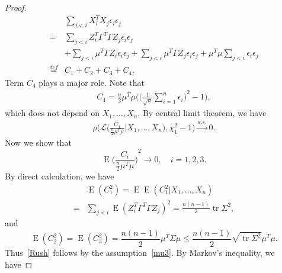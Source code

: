 \documentclass[smallcondensed,final,natbib]{svjour3}          %
\DeclareMathOperator{\mytr}{tr}
\DeclareMathOperator{\myE}{E}
\begin{document}
\begin{proof}
    \begin{equation*}
        \begin{aligned}
            &\sum_{j<i} X_i^T X_j \epsilon_i\epsilon_j\\
            =&
            \sum_{j<i} Z_i^T \Gamma^T \Gamma Z_j \epsilon_i\epsilon_j\\
            &+
            \sum_{j<i} \mu^T \Gamma Z_i \epsilon_i\epsilon_j
            +\sum_{j<i} \mu^T \Gamma Z_j \epsilon_i\epsilon_j+
            \mu^T \mu \sum_{j<i} \epsilon_i\epsilon_j\\
            \overset{def}{=}&C_1+C_2+C_3+C_4.
        \end{aligned}
    \end{equation*}
Term $C_4$ plays a major role. Note that
    \begin{equation*}
        \begin{aligned}
            C_4=\frac{n}{2}\mu^T \mu\Big({\Big(\frac{1}{\sqrt{n}}\sum_{i=1}^n \epsilon_i\Big)}^2-1\Big),
        \end{aligned}
    \end{equation*}
    which does not depend on $X_1,\ldots,X_n$.
By central limit theorem, we have
    \begin{equation}\label{Rush2}
        \begin{aligned}
            \rho\Big(\mathcal{L}\Big(\frac{C_4}{\frac{n}{2}\mu^T \mu}\Big| X_1,\ldots,X_n\Big),\chi^2_1-1\Big)\xrightarrow{a.s.} 0.
        \end{aligned}
    \end{equation}
Now we show that
    \begin{equation}\label{Rush}
    \myE{\Big(\frac{C_i}{\frac{n}{2}\mu^T\mu}\Big)}^2\to 0,
    \quad i=1,2,3.
    \end{equation}
    By direct calculation, we have
    \begin{equation*}
    \begin{aligned}
    &\myE(C_1^2)=\myE\myE(C_1^2|X_1,\ldots,X_n)\\
    =&\sum_{j<i}\myE{(Z_i^T \Gamma^T \Gamma Z_j)}^2=\frac{n(n-1)}{2}\mytr \Sigma^2,
    \end{aligned}
\end{equation*}
    and
    \begin{equation*}
    \myE(C_2^2)=\myE(C_3^2)=\frac{n(n-1)}{2}\mu^T \Sigma \mu\leq \frac{n(n-1)}{2}\sqrt{\mytr \Sigma^2}\mu^T\mu.
    \end{equation*}
    Thus~\eqref{Rush} follows by the assumption~\eqref{mu3}. By Markov's inequality, we have

\end{proof}
\end{document}
